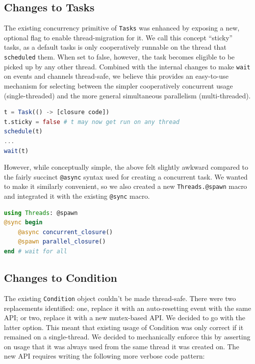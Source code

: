 \documentclass{juliacon}
\begin{document}
\subsection{Changes to Tasks}
\label{subsub:integration-tasks}

The existing concurrency primitive of \verb|Tasks| was enhanced by exposing a new, optional flag to enable thread-migration for it. We call this concept ``sticky'' tasks, as a default tasks is only cooperatively runnable on the thread that \verb|scheduled| them. When set to false, however, the task becomes eligible to be picked up by any other thread. Combined with the internal changes to make \verb|wait| on events and channels thread-safe, we believe this provides an easy-to-use mechanism for selecting between the simpler cooperatively concurrent usage (single-threaded) and the more general simultaneous parallelism (multi-threaded).

\begin{lstlisting}[language = Julia]
t = Task(() -> [closure code])
t.sticky = false # t may now get run on any thread
schedule(t)
...
wait(t)
\end{lstlisting}

However, while conceptually simple, the above felt slightly awkward compared to the fairly succinct \verb|@async| syntax used for creating a concurrent task. We wanted to make it similarly convenient, so we also created a new \verb|Threads.@spawn| macro and integrated it with the existing \verb|@sync| macro.

\begin{lstlisting}[language = Julia]
using Threads: @spawn
@sync begin
    @async concurrent_closure()
    @spawn parallel_closure()
end # wait for all
\end{lstlisting}

\subsection{Changes to Condition}
\label{subsub:integration-condition}

The existing \verb|Condition| object couldn't be made thread-safe. There were two replacements identified: one, replace it with an auto-resetting event with the same API; or two, replace it with a new mutex-based API. We decided to go with the latter option. This meant that existing usage of Condition was only correct if it remained on a single-thread. We decided to mechanically enforce this by asserting on usage that it was always used from the same thread it was created on. The new API requires writing the following more verbose code pattern:
\end{document}
